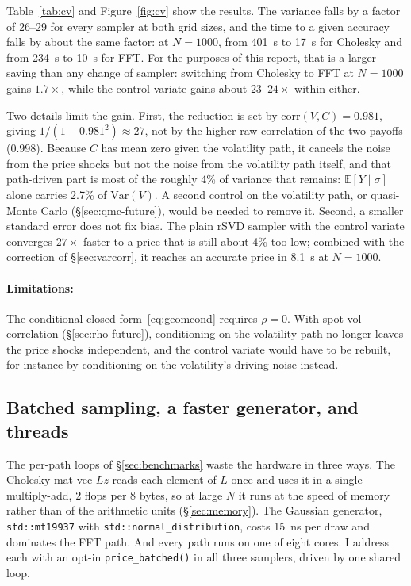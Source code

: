Table~\ref{tab:cv} and Figure~\ref{fig:cv} show the results.  The variance falls by a
factor of 26--29 for every sampler at both grid sizes, and the time to a given accuracy
falls by about the same factor: at $N = 1000$, from 401~s to 17~s for Cholesky and from
234~s to 10~s for FFT.  For the purposes of this report, that is a larger saving than
any change of sampler: switching from Cholesky to FFT at $N = 1000$ gains $1.7\times$, while
the control variate gains about $23$--$24\times$ within either.

Two details limit the gain.  First, the reduction is set by
$\mathrm{corr}(V, C) = 0.981$, giving $1/(1 - 0.981^2) \approx 27$, not by the higher raw
correlation of the two payoffs (0.998).  Because $C$ has mean zero given the volatility
path, it cancels the noise from the price shocks but not the noise from the volatility
path itself, and that path-driven part is most of the roughly 4\% of variance that
remains: $\mathbb{E}[Y \mid \sigma]$ alone carries 2.7\% of $\mathrm{Var}(V)$.  A second
control on the volatility path, or quasi-Monte Carlo (§\ref{sec:qmc-future}), would be
needed to remove it.  Second, a smaller standard error does not fix bias.  The plain
rSVD sampler with the control variate converges $27\times$ faster to a price that is still
about 4\% too low; combined with the correction of §\ref{sec:varcorr}, it reaches an
accurate price in 8.1~s at $N = 1000$.

\paragraph{Limitations: }
The conditional closed form~\eqref{eq:geomcond} requires $\rho = 0$.  With spot-vol
correlation (§\ref{sec:rho-future}), conditioning on the volatility path no longer
leaves the price shocks independent, and the control variate would have to be
rebuilt, for instance by conditioning on the volatility's driving noise instead.

\subsection{Batched sampling, a faster generator, and threads}
\label{sec:perf}

The per-path loops of §\ref{sec:benchmarks} waste the hardware in three ways.  The
Cholesky mat-vec $Lz$ reads each element of $L$ once and uses it in a single
multiply-add, 2 flops per 8 bytes, so at large $N$ it runs at the speed of memory
rather than of the arithmetic units (§\ref{sec:memory}).  The Gaussian generator,
\texttt{std::mt19937} with \texttt{std::normal\_distribution}, costs 15~ns per draw and
dominates the FFT path.  And every path runs on one of eight cores.  I address each with
an opt-in \texttt{price\_batched()} in all three samplers, driven by one shared loop.

